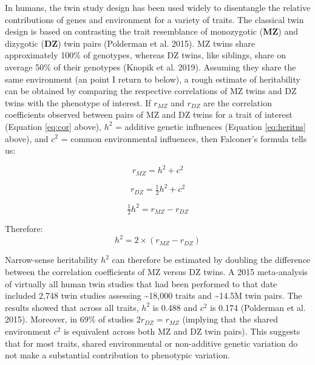 \documentclass[
]{book}
\begin{document}
In humans, the twin study design has been used widely to disentangle the relative contributions of genes and environment for a variety of traits. The classical twin design is based on contrasting the trait resemblance of monozygotic (\textbf{MZ}) and dizygotic (\textbf{DZ}) twin pairs (Polderman et al. 2015). MZ twins share approximately 100\% of genotypes, whereas DZ twins, like siblings, share on average 50\% of their genotypes (Knopik et al. 2019). Assuming they share the same environment (an point I return to below), a rough estimate of heritability can be obtained by comparing the respective correlations of MZ twins and DZ twins with the phenotype of interest. If \(r_{MZ}\) and \(r_{DZ}\) are the correlation coefficients observed between pairs of MZ and DZ twins for a trait of interest (Equation \eqref{eq:cor} above), \(h^2\) = additive genetic influences (Equation \eqref{eq:heritns} above), and \(c^2\) = common environmental influences, then Falconer's formula tells us:

\begin{equation}
r_{MZ} = h^2 + c^2
\end{equation}

\begin{equation}
r_{DZ} = \tfrac{1}{2}h^2 + c^2
\end{equation}

\begin{equation}
\tfrac{1}{2}h^2 = r_{MZ} - r_{DZ}
\end{equation}

Therefore:
\begin{equation}
h^2 = 2\times(r_{MZ} - r_{DZ})
\end{equation}

Narrow-sense heritability \(h^2\) can therefore be estimated by doubling the difference between the correlation coefficients of MZ versus DZ twins. A 2015 meta-analysis of virtually all human twin studies that had been performed to that date included 2,748 twin studies assessing \textasciitilde18,000 traits and \textasciitilde14.5M twin pairs. The results showed that across all traits, \(h^2\) is 0.488 and \(c^2\) is 0.174 (Polderman et al. 2015). Moreover, in 69\% of studies \(2r_{DZ} = r_{MZ}\) (implying that the shared environment \(c^2\) is equivalent across both MZ and DZ twin pairs). This suggests that for most traits, shared environmental or non-additive genetic variation do not make a substantial contribution to phenotypic variation.
\end{document}

